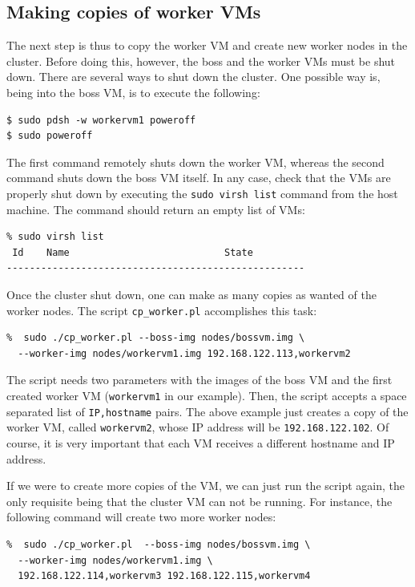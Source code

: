 \documentclass[a4]{article}
\begin{document}
\subsection{Making copies of worker VMs}
\label{sec:making-copies-worker}

The next step is thus to copy the worker VM and create new worker nodes in
the cluster. Before doing this, however, the boss and the worker VMs must be
shut down. There are several ways to shut down the cluster. One possible way
is, being into the boss VM, is to execute the following:

\begin{verbatim}
$ sudo pdsh -w workervm1 poweroff
$ sudo poweroff
\end{verbatim}

The first command remotely shuts down the worker VM, whereas the second
command shuts down the boss VM itself. In any case, check that the VMs are
properly shut down by executing the \texttt{sudo virsh list} command from
the host machine. The command should return an empty list of VMs:

\begin{verbatim}
% sudo virsh list
 Id    Name                           State
----------------------------------------------------
\end{verbatim}


Once the cluster shut down, one can make as many copies as wanted of the
worker nodes. The script \texttt{cp\_worker.pl} accomplishes this task:

\begin{verbatim}
%  sudo ./cp_worker.pl --boss-img nodes/bossvm.img \
  --worker-img nodes/workervm1.img 192.168.122.113,workervm2
\end{verbatim}

The script needs two parameters with the images of the boss VM and the first
created worker VM (\texttt{workervm1} in our example). Then, the script
accepts a space separated list of \texttt{IP,hostname} pairs. The above
example just creates a copy of the worker VM, called \texttt{workervm2},
whose IP address will be \texttt{192.168.122.102}. Of course, it is very
important that each VM receives a different hostname and IP address. 

If we were to create more copies of the VM, we can just run the script
again, the only requisite being that the cluster VM can not be running. For
instance, the following command will create two more worker nodes:

\begin{verbatim}
%  sudo ./cp_worker.pl  --boss-img nodes/bossvm.img \
  --worker-img nodes/workervm1.img \
  192.168.122.114,workervm3 192.168.122.115,workervm4
\end{verbatim}
\end{document}
